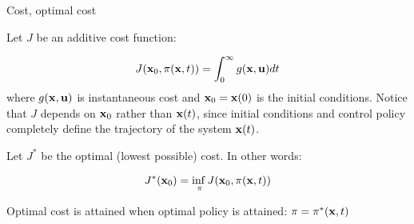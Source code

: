 \documentclass{beamer}
\begin{document}
\begin{frame}{Cost, optimal cost}
\begin{flushleft}

Let $J$ be an additive cost function:

\begin{equation}
J (\mathbf{x}_0, \pi (\mathbf{x}, t)) = \int_0^\infty g(\mathbf{x}, \mathbf{u}) dt
\end{equation}
%
where $g(\mathbf{x}, \mathbf{u})$ is instantaneous cost and $\mathbf{x}_0 = \mathbf{x}(0)$ is the initial conditions. Notice that $J$ depends on $\mathbf{x}_0$ rather than $\mathbf{x}(t)$, since initial conditions and control policy completely define the trajectory of the system $\mathbf{x}(t)$.


\bigskip

Let $J^*$ be the optimal (lowest possible) cost. In other words:

\begin{equation}
J^*(\mathbf{x}_0) = \underset{\pi}{\inf{}} J(\mathbf{x}_0, \pi (\mathbf{x}, t))
\end{equation}

Optimal cost is attained when optimal policy is attained: $\pi = \pi^*(\mathbf{x}, t)$

\end{flushleft}
\end{frame}





%
%
%
%
%
%
%
%
%
\end{document}
